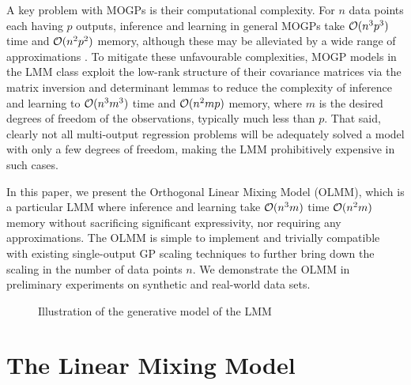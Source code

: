 \documentclass{article}
\begin{document}
A key problem with MOGPs is their computational complexity.
For $n$ data points each having $p$ outputs, inference and learning in general MOGPs take $\mathcal{O}(n^3p^3)$ time and $\mathcal{O}(n^2p^2)$ memory, although these may be alleviated by a wide range of approximations \cite{Quinonero:2005:Unifying_View,Titsias:2009:Variational_Learning,Lazaro-Gredilla:2010:Sparse_Spectrum_Gaussian_Process_Regression,Hensman:2013:Gaussian_Processes_for_Big_Data,Wilson:2015:Kernel_Interpolation_for_Scalable_Structured,Bui:2016:A_Unifying_Framework_for_Gaussian,Cheng:2017:Variational_Inference_for_Gaussian_Process}.
To mitigate these unfavourable complexities, MOGP models in the LMM class exploit the low-rank structure of their covariance matrices via the matrix inversion and determinant lemmas to reduce the complexity of inference and learning to $\mathcal{O}(n^3m^3)$ time and $\mathcal{O}(n^2 m p)$ memory, where $m$ is the desired degrees of freedom of the observations, typically much less than $p$.
That said, clearly not all multi-output regression problems will be adequately solved a model with only a few degrees of freedom, making the LMM prohibitively expensive in such cases.


In this paper, we present the Orthogonal Linear Mixing Model (OLMM), which is a particular LMM where inference and learning take $\mathcal{O}(n^3m)$ time $\mathcal{O}(n^2 m)$ memory without sacrificing significant expressivity, nor requiring any approximations.
The OLMM is simple to implement and trivially compatible with existing single-output GP scaling techniques to further bring down the scaling in the number of data points $n$.
We demonstrate the OLMM in preliminary experiments on synthetic and real-world data sets.


\begin{figure}
    \centering
    \caption{Illustration of the generative model of the LMM}
    \label{fig:generative_model_lmm}
\end{figure}

\section{The Linear Mixing Model}
\label{sec:lmm}
\end{document}
